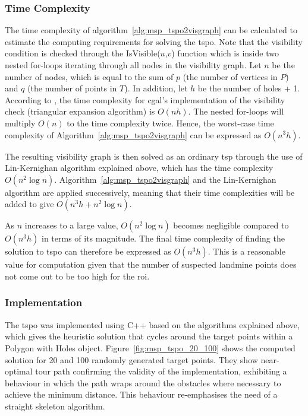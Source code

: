 \subsubsection{Time Complexity}

The time complexity of algorithm~\ref{alg:msp_tspo2visgraph} can be calculated to estimate the computing requirements for solving the \gls{tspo}. Note that the visibility condition is checked through the IsVisible($u$,$v$) function which is inside two nested for-loops iterating through all nodes in the visibility graph. Let $n$ be the number of nodes, which is equal to the sum of $p$ (the number of vertices in $P$) and $q$ (the number of points in $T$). In addition, let $h$ be the number of holes + 1. According to \cite{cgal2024visibility}, the time complexity for \gls{cgal}'s implementation of the visibility check (triangular expansion algorithm) is $O(n h)$. The nested for-loops will multiply $O(n)$ to the time complexity twice. Hence, the worst-case time complexity of Algorithm~\ref{alg:msp_tspo2visgraph} can be expressed as $O(n^3 h)$. 

The resulting visibility graph is then solved as an ordinary \gls{tsp} through the use of Lin-Kernighan algorithm explained above, which has the time complexity $O(n^2\log{n})$. Algorithm~\ref{alg:msp_tspo2visgraph} and the Lin-Kernighan algorithm are applied successively, meaning that their time complexities will be added to give $O(n^3 h + n^2\log{n})$. 

As $n$ increases to a large value, $O(n^2\log{n})$ becomes negligible compared to $O(n^3 h)$ in terms of its magnitude. The final time complexity of finding the solution to \gls{tspo} can therefore be expressed as $O(n^3 h)$. This is a reasonable value for computation given that the number of suspected landmine points does not come out to be too high for the \gls{roi}. 

\subsubsection{Implementation}

The \gls{tspo} was implemented using C++ based on the algorithms explained above, which gives the heuristic solution that cycles around the target points within a Polygon with Holes object. Figure~\ref{fig:msp_tspo_20_100} shows the computed solution for 20 and 100 randomly generated target points. They show near-optimal tour path confirming the validity of the implementation, exhibiting a behaviour in which the path wraps around the obstacles where necessary to achieve the minimum distance. This behaviour re-emphasises the need of a straight skeleton algorithm. 

